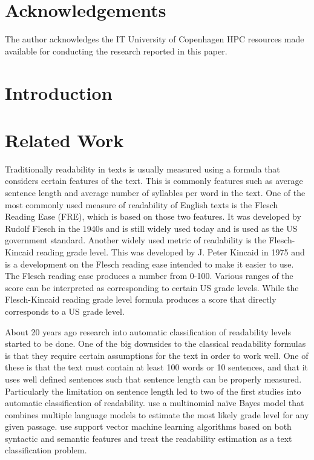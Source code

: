 \documentclass[11pt,a4paper]{article}
\begin{document}
\section{Acknowledgements}

The author acknowledges the IT University of Copenhagen HPC resources made available for conducting the research reported in this paper.

\section{Introduction}

\section{Related Work}

Traditionally readability in texts is usually measured using a formula that
considers certain features of the text. This is commonly features such as
average sentence length and average number of syllables per word in the text.
One of the most commonly used measure of readability of English texts is the
Flesch Reading Ease (FRE), which is based on those two features. It was developed by
Rudolf Flesch in the 1940s and is still widely used today and is used as the US
government standard. Another widely used metric of readability is the Flesch-Kincaid reading grade level. This was
developed by J. Peter Kincaid in 1975 and is a development on the Flesch
reading ease intended to make it easier to use. The Flesch reading ease
produces a number from 0-100. Various ranges of the score can be interpreted as
corresponding to certain US grade levels. While the Flesch-Kincaid reading
grade level formula produces a score that directly corresponds to a US grade
level.

About 20 years ago research into automatic classification of readability levels
started to be done. One of the big downsides to the classical readability
formulas is that they require certain assumptions for the text in order to work
well. One of these is that the text must contain at least 100 words or 10
sentences, and that it uses well defined sentences such that sentence length
can be properly measured. Particularly the limitation on sentence length led to
two of the first studies into automatic classification of readability.
\parencite{collins-thompson-callan-2004-language}
use a multinomial naïve Bayes model that combines multiple language models to
estimate the most likely grade level for any given passage.
\parencite{10.1145/1008992.1009114} use support vector machine learning algorithms
based on both syntactic and semantic features and treat the readability
estimation as a text classification problem.
\end{document}
